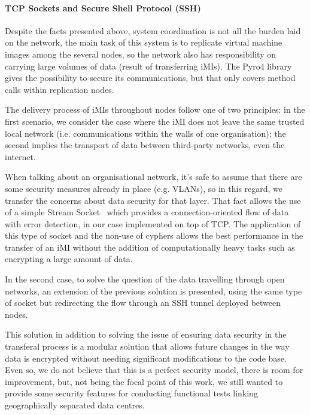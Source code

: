\paragraph{TCP Sockets and Secure Shell Protocol (SSH)}
\label{par:rep_tcp_sockets}
Despite the facts presented above, system coordination is not all the burden laid on the network, the main task of this system is to replicate virtual machine images among the several nodes, so the network also has responsibility on carrying large volumes of data (result of transferring iMIs). The Pyro4 library gives the possibility to secure its communications, but that only covers method calls within replication nodes. 

The delivery process of iMIs throughout nodes follow one of two principles: in the first scenario, we consider the case where the iMI does not leave the same trusted local network (i.e. communications within the walls of one organisation); the second implies the transport of data between third-party networks, even the internet. 

When talking about an organisational network, it's safe to assume that there are some security measures already in place (e.g. VLANs), so in this regard, we transfer the concerns about data security for that layer. That fact allows the use of a simple Stream Socket~\cite{py_socks} which provides a connection-oriented flow of data with error detection, in our case implemented on top of TCP. The application of this type of socket and the non-use of cyphers allows the best performance in the transfer of an iMI without the addition of computationally heavy tasks such as encrypting a large amount of data.

In the second case, to solve the question of the data travelling through open networks, an extension of the previous solution is presented, using the same type of socket but redirecting the flow through an SSH tunnel deployed between nodes. 

This solution in addition to solving the issue of ensuring data security in the transferal process is a modular solution that allows future changes in the way data is encrypted without needing significant modifications to the code base. Even so, we do not believe that this is a perfect security model, there is room for improvement, but, not being the focal point of this work, we still wanted to provide some security features for conducting functional tests linking geographically separated data centres.



